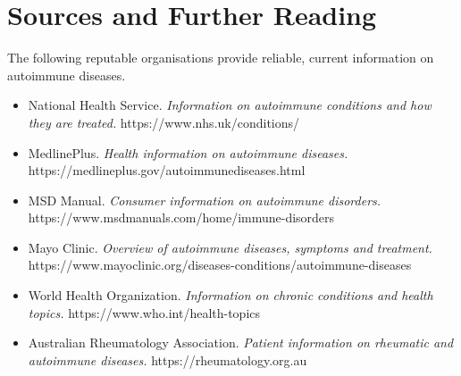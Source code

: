 \section*{Sources and Further Reading}
The following reputable organisations provide reliable, current information on autoimmune diseases.

\begin{itemize}
    \item National Health Service. \textit{Information on autoimmune conditions and how they are treated.} https://www.nhs.uk/conditions/
    \item MedlinePlus. \textit{Health information on autoimmune diseases.} https://medlineplus.gov/autoimmunediseases.html
    \item MSD Manual. \textit{Consumer information on autoimmune disorders.} https://www.msdmanuals.com/home/immune-disorders
    \item Mayo Clinic. \textit{Overview of autoimmune diseases, symptoms and treatment.} https://www.mayoclinic.org/diseases-conditions/autoimmune-diseases
    \item World Health Organization. \textit{Information on chronic conditions and health topics.} https://www.who.int/health-topics
    \item Australian Rheumatology Association. \textit{Patient information on rheumatic and autoimmune diseases.} https://rheumatology.org.au
\end{itemize}
